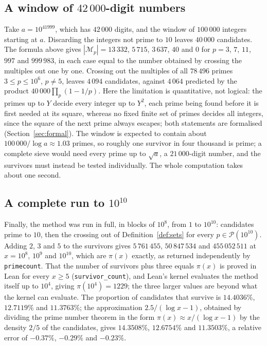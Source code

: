 \documentclass[11pt]{amsart}
\theoremstyle{definition}
\theoremstyle{remark}
\newcommand{\Sv}{\mathcal{P}}
\newcommand{\Mult}{\mathcal{M}}
\newcommand{\lean}[1]{\texttt{#1}}
\begin{document}
\subsection{A window of $42\,000$-digit numbers}
Take $a=10^{41999}$, which has $42\,000$ digits, and the window of $100\,000$ integers starting at $a$. Discarding the integers not prime to $10$ leaves $40\,000$ candidates. The formula above gives $|\Mult_p|=13\,332$, $5\,715$, $3\,637$, $40$ and $0$ for $p=3$, $7$, $11$, $997$ and $999\,983$, in each case equal to the number obtained by crossing the multiples out one by one. Crossing out the multiples of all $78\,496$ primes $3\le p\le10^6$, $p\ne5$, leaves $4\,094$ candidates, against $4\,064$ predicted by the product $40\,000\prod_p(1-1/p)$. Here the limitation is quantitative, not logical: the primes up to $Y$ decide every integer up to $Y^2$, each prime being found before it is first needed at its square, whereas no fixed finite set of primes decides all integers, since the square of the next prime always escapes; both statements are formalised (Section~\ref{sec:formal}). The window is expected to contain about $100\,000/\log a\approx1.03$ primes, so roughly one survivor in four thousand is prime; a complete sieve would need every prime up to $\sqrt a$, a $21\,000$-digit number, and the survivors must instead be tested individually. The whole computation takes about one second.

\subsection{A complete run to $10^{10}$}
Finally, the method was run in full, in blocks of $10^8$, from $1$ to $10^{10}$: candidates prime to $10$, then the crossing out of Definition~\ref{def:sets} for every $p\in\Sv(10^{10})$. Adding $2$, $3$ and $5$ to the survivors gives $5\,761\,455$, $50\,847\,534$ and $455\,052\,511$ at $x=10^8$, $10^9$ and $10^{10}$, which are $\pi(x)$ exactly, as returned independently by \texttt{primecount}. That the number of survivors plus three equals $\pi(x)$ is proved in Lean for every $x\ge5$ (\lean{survivor\_count}), and Lean's kernel evaluates the method itself up to $10^4$, giving $\pi(10^4)=1229$; the three larger values are beyond what the kernel can evaluate. The proportion of candidates that survive is $14.4036\%$, $12.7119\%$ and $11.3763\%$; the approximation $2.5/(\log x-1)$, obtained by dividing the prime number theorem in the form $\pi(x)\approx x/(\log x-1)$ by the density $2/5$ of the candidates, gives $14.3508\%$, $12.6754\%$ and $11.3503\%$, a relative error of $-0.37\%$, $-0.29\%$ and $-0.23\%$.
\end{document}
